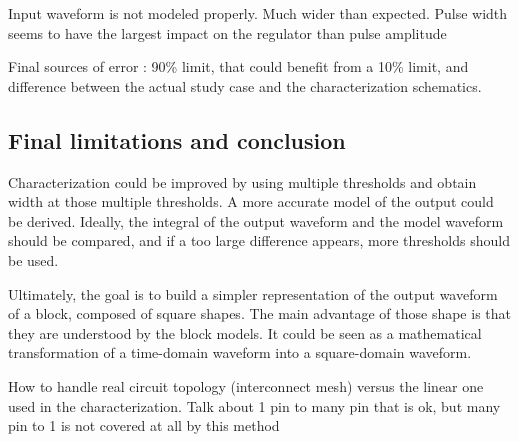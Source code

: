 
Input waveform is not modeled properly. Much wider than expected.
Pulse width seems to have the largest impact on the regulator than pulse amplitude

Final sources of error : 90\% limit, that could benefit from a 10\% limit, and difference between the actual study case and the characterization schematics.

\subsection{Final limitations and conclusion}

Characterization could be improved by using multiple thresholds and obtain width at those multiple thresholds.
A more accurate model of the output could be derived.
Ideally, the integral of the output waveform and the model waveform should be compared, and if a too large difference appears, more thresholds should be used.


Ultimately, the goal is to build a simpler representation of the output waveform of a block, composed of square shapes.
The main advantage of those shape is that they are understood by the block models.
It could be seen as a mathematical transformation of a time-domain waveform into a square-domain waveform.

How to handle real circuit topology (interconnect mesh) versus the linear one used in the characterization.
Talk about 1 pin to many pin that is ok, but many pin to 1 is not covered at all by this method
